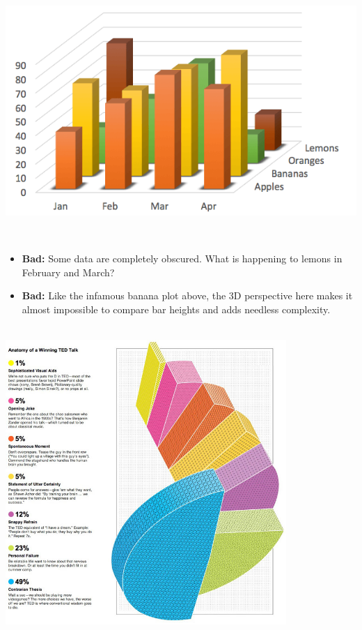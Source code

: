 \documentclass[
]{book}
\providecommand{\tightlist}{%
  \setlength{\itemsep}{0pt}\setlength{\parskip}{0pt}}
\begin{document}
~\\

\includegraphics{img/vis13.png}

~

\begin{itemize}
\tightlist
\item
  \textbf{Bad:} Some data are completely obscured. What is happening to lemons in February and March?\\
\item
  \textbf{Bad:} Like the infamous banana plot above, the 3D perspective here makes it almost impossible to compare bar heights and adds needless complexity.
\end{itemize}

~\\

\includegraphics[width=0.8\textwidth,height=\textheight]{img/vis15.jpg}
\end{document}
